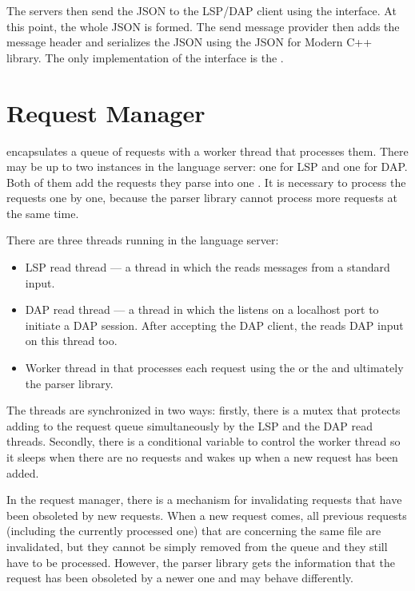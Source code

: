 The servers then send the JSON to the LSP/DAP client using the  interface. At this point, the whole JSON is formed. The send message provider then adds the message header and serializes the JSON using the JSON for Modern C++ library. The only implementation of the  interface is the .

\section{Request Manager}

 encapsulates a queue of requests with a worker thread that processes them. There may be up to two  instances in the language server: one for LSP and one for DAP. Both of them add the requests they parse into one . It is necessary to process the requests one by one, because the parser library cannot process more requests at the same time.

There are three threads running in the language server:
\begin{itemize}
	\item LSP read thread --- a thread in which the  reads messages from a standard input.
	\item DAP read thread --- a thread in which the  listens on a localhost port to initiate a DAP session. After accepting the DAP client, the  reads DAP input on this thread too.
	\item Worker thread in  that processes each request using the  or the  and ultimately the parser library.
\end{itemize}

The threads are synchronized in two ways: firstly, there is a mutex that protects adding to the request queue simultaneously by the LSP and the DAP read threads. Secondly, there is a conditional variable to control the worker thread so it sleeps when there are no requests and wakes up when a new request has been added.

In the request manager, there is a mechanism for invalidating requests that have been obsoleted by new requests. When a new request comes, all previous requests (including the currently processed one) that are concerning the same file are invalidated, but they cannot be simply removed from the queue and they still have to be processed. However, the parser library gets the information that the request has been obsoleted by a newer one and may behave differently.

